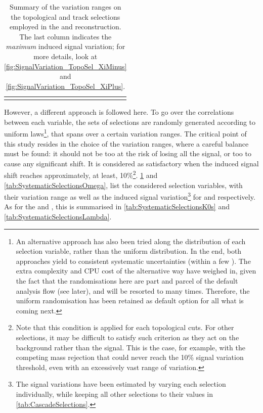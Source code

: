 \begin{table}[t]
\begin{tabular}{c|c|c}
    \noalign{\smallskip}\hline \noalign{\smallskip}
    \end{tabular}
    \caption{Summary of the variation ranges on the topological and track selections employed in the \rmXiM and \rmAxiP reconstruction. The last column indicates the \textit{maximum} induced signal variation; for more details, look at \fig\ref{fig:SignalVariation_TopoSel_XiMinus} and \fig\ref{fig:SignalVariation_TopoSel_XiPlus}.}\label{tab:SystematicSelectionsXi}
\end{table}

However, a different approach is followed here. To go over the correlations between each variable, the sets of selections are randomly generated according to uniform laws\footnote{An alternative approach has also been tried along the  distribution of each selection variable, rather than the uniform distribution. In the end, both approaches yield to consistent systematic uncertainties (within a few \kmass). The extra complexity and CPU cost of the alternative way have weighed in, given the fact that the randomisations here are part and parcel of the default analysis flow (see later), and will be resorted to many times. Therefore, the uniform randomisation has been retained as default option for all what is coming next.}, that spans over a certain variation ranges. The critical point of this study resides in the choice of the variation ranges, where a careful balance must be found: it should not be too  at the risk of losing all the signal, or too  to cause any significant shift. It is considered as satisfactory when the induced signal shift reaches approximately, at least, 10\%\footnote{Note that this condition is applied for each topological cuts. For other selections, it may be difficult to satisfy such criterion as they act on the background rather than the signal. This is the case, for example, with the competing mass rejection that could never reach the 10\% signal variation threshold, even with an excessively vast range of variation.}. \Tabs\ref{tab:SystematicSelectionsXi} and \ref{tab:SystematicSelectionsOmega}, list the considered selection variables, with their variation range as well as the induced signal variation\footnote{The signal variations have been estimated by varying each selection individually, while keeping all other selections to their values in \tab\ref{tab:CascadeSelections}.} for \rmXi and \rmOmega respectively. As for the \rmKzeroS and \rmLambda, this is summarised in \tabs\ref{tab:SystematicSelectionsK0s} and \ref{tab:SystematicSelectionsLambda}. \\

